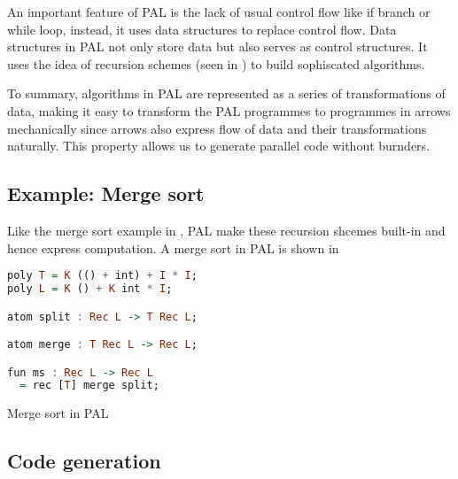 An important feature of PAL is the lack of usual control flow like if branch or while loop, instead, it uses data structures to replace control flow. Data structures in PAL not only store data but also serves as control structures. It uses the idea of recursion schemes (seen in ) to build sophiscated algorithms. 

To summary, algorithms in PAL are represented as a series of transformations of data, making it easy to transform the PAL programmes to programmes in arrows mechanically since arrows also express flow of data and their transformations naturally. This property allows us to generate parallel code without burnders.

\subsection{Example: Merge sort}

Like the merge sort example in , PAL make these recursion shcemes built-in and hence express computation. A merge sort in PAL is shown in 
\begin{code}
\begin{lstlisting}[language=haskell]
poly T = K (() + int) + I * I;
poly L = K () + K int * I;

atom split : Rec L -> T Rec L;

atom merge : T Rec L -> Rec L;

fun ms : Rec L -> Rec L
  = rec [T] merge split;
\end{lstlisting}
\caption{Merge sort in PAL} \label{p:pal:c5}
\end{code}
\subsection{Code generation}